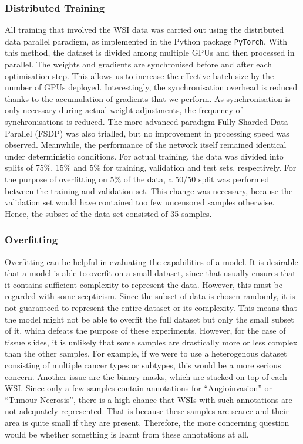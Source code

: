 \subsubsection{Distributed Training} 
All training that involved the WSI data was carried out using the distributed data parallel paradigm, as implemented in the Python package \verb|PyTorch|. With this method, the dataset is divided among multiple GPUs and then processed in parallel. The weights and gradients are synchronised before and after each optimisation step. This allows us to increase the effective batch size by the number of GPUs deployed. Interestingly, the synchronisation overhead is reduced thanks to the accumulation of gradients that we perform. As synchronisation is only necessary during actual weight adjustments, the frequency of synchronisations is reduced. The more advanced paradigm Fully Sharded Data Parallel (FSDP) was also trialled, but no improvement in processing speed was observed. Meanwhile, the performance of the network itself remained identical under deterministic conditions. 
For actual training, the data was divided into splits of 75\%, 15\% and 5\% for training, validation and test sets, respectively. For the purpose of overfitting on 5\% of the data, a 50/50 split was performed between the training and validation set. This change was necessary, because the validation set would have contained too few uncensored samples otherwise. Hence, the subset of the data set consisted of 35 samples.
\subsubsection{Overfitting} 
Overfitting can be helpful in evaluating the capabilities of a model. It is desirable that a model is able to overfit on a small dataset, since that usually ensures that it contains sufficient complexity to represent the data. However, this must be regarded with some scepticism. Since the subset of data is chosen randomly, it is not guaranteed to represent the entire dataset or its complexity. This means that the model might not be able to overfit the full dataset but only the small subset of it, which defeats the purpose of these experiments. However, for the case of tissue slides, it is unlikely that some samples are drastically more or less complex than the other samples. For example, if we were to use a heterogenous dataset consisting of multiple cancer types or subtypes, this would be a more serious concern. 
Another issue are the binary masks, which are stacked on top of each WSI. Since only a few samples contain annotations for “Angioinvasion” or “Tumour Necrosis”, there is a high chance that WSIs with such annotations are not adequately represented. That is because these samples are scarce and their area is quite small if they are present. Therefore, the more concerning question would be whether something is learnt from these annotations at all.

